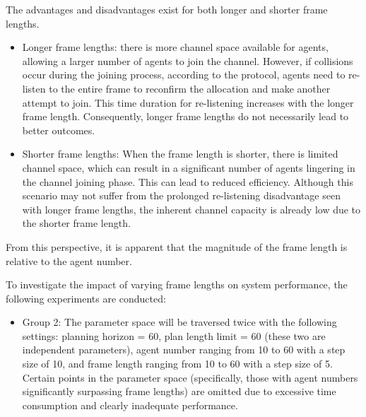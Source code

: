 The advantages and disadvantages exist for both longer and shorter frame lengths.
\begin{itemize}
    \item Longer frame lengths:  there is more channel space available for agents, allowing a larger number of agents to join the channel. However, if collisions occur during the joining process, according to the protocol, agents need to re-listen to the entire frame to reconfirm the allocation and make another attempt to join. This time duration for re-listening increases with the longer frame length. Consequently, longer frame lengths do not necessarily lead to better outcomes.
    \item Shorter frame lengths: When the frame length is shorter, there is limited channel space, which can result in a significant number of agents lingering in the channel joining phase. This can lead to reduced efficiency. Although this scenario may not suffer from the prolonged re-listening disadvantage seen with longer frame lengths, the inherent channel capacity is already low due to the shorter frame length.
\end{itemize}

From this perspective, it is apparent that the magnitude of the frame length is relative to the agent number.

To investigate the impact of varying frame lengths on system performance, the following experiments are conducted:

\begin{itemize}
    \item Group 2: The parameter space will be traversed twice with the following settings: planning horizon = 60, plan length limit = 60 (these two are independent parameters), agent number ranging from 10 to 60 with a step size of 10, and frame length ranging from 10 to 60 with a step size of 5.
    Certain points in the parameter space (specifically, those with agent numbers significantly surpassing frame lengths) are omitted due to excessive time consumption and clearly inadequate performance.
\end{itemize}

